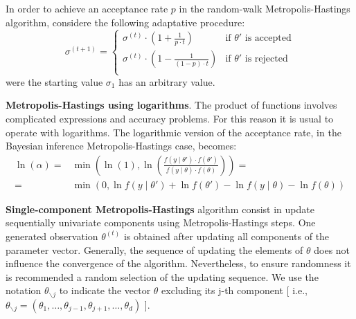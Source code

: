 \documentclass[11pt,fleqn]{book} %
\begin{document}
\begin{proposition}
	In order to achieve an acceptance rate $p$ in the random-walk 
	Metropolis-Hastings algorithm, considere the following adaptative
	procedure:
	\begin{displaymath}
		\sigma^{(t+1)} = \left\{
		\begin{array}{ll}
			\sigma^{(t)} \cdot \left( 1 + \frac{1}{p \cdot t} \right) & \text{if $\theta'$ is accepted} \\
			\sigma^{(t)} \cdot \left( 1 - \frac{1}{(1-p) \cdot t} \right) & \text{if $\theta'$ is rejected} \\
		\end{array}
		\right.
	\end{displaymath}
	were the starting value $\sigma_1$ has an arbitrary value.
\end{proposition}

\textbf{Metropolis-Hastings using logarithms}.
The product of functions involves complicated expressions and accuracy 
problems. For this reason it is usual to operate with logarithms. The 
logarithmic version of the acceptance rate, in the Bayesian inference 
Metropolis-Hastings case, becomes:
\begin{displaymath}
	\begin{array}{rl}
		\ln(\alpha) = & \min \left( \ln(1),  
		\ln \left(\frac{f(y \mid \theta') \cdot f(\theta')}{f(y \mid \theta) \cdot f(\theta)}\right)
		\right) = \\
		= & \min \left( 0,
		\ln f(y \mid \theta') + \ln f(\theta') - \ln f(y \mid \theta) - \ln f(\theta)
		\right)
	\end{array}
\end{displaymath}

\textbf{Single-component Metropolis-Hastings} algorithm consist in update 
sequentially univariate components using Metropolis-Hastings steps. 
One generated observation $\theta^{(t)}$ is obtained after updating all 
components of the parameter vector. Generally, the sequence of updating the 
elements of $\theta$ does not influence the convergence of the algorithm.
Nevertheless, to ensure randomness it is recommended a random selection of 
the updating sequence. We use the notation $\theta_{\backslash j}$ to indicate 
the vector $\theta$ excluding its j-th component [ i.e., $\theta_{\backslash j}
= (\theta_1,\dots,\theta_{j-1},\theta_{j+1},\dots,\theta_{d})$ ].
\end{document}
